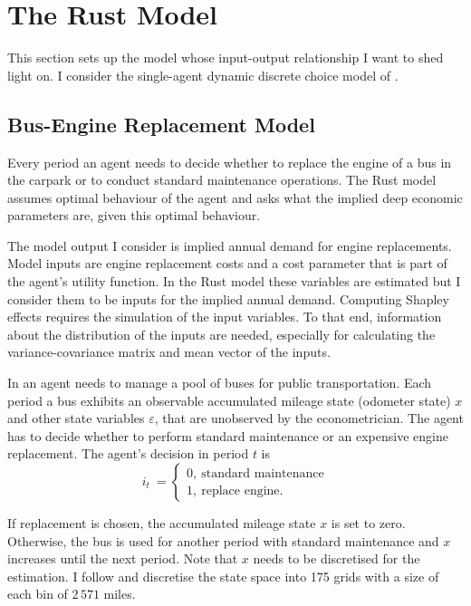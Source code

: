 \section{The Rust Model} \label{rust_model}

This section sets up the model whose input-output relationship I want to shed light on. I consider the single-agent dynamic discrete choice model of \citet{R87}.

\subsection{Bus-Engine Replacement Model}

Every period an agent needs to decide whether to replace the engine of a bus in the carpark or to conduct standard maintenance operations. The Rust model assumes optimal behaviour of the agent and asks what the implied deep economic parameters are, given this optimal behaviour.

The model output I consider is implied annual demand for engine replacements. Model inputs are engine replacement costs and a cost parameter that is part of the agent’s utility function. In the Rust model these variables are estimated but I consider them to be inputs for the implied annual demand. Computing Shapley effects requires the simulation of the input variables. To that end, information about the distribution of the inputs are needed, especially for calculating the variance-covariance matrix and mean vector of the inputs.

In \citet{R87} an agent needs to manage a pool of buses for public transportation. Each period a bus exhibits an observable accumulated mileage state (odometer state) $x$ and other state variables $\varepsilon$, that are unobserved by the econometrician. The agent has to decide whether to perform standard maintenance or an expensive engine replacement. The agent’s decision in period $t$ is
\begin{equation}
i_t\ =
\begin{cases}
0,\ \text{standard maintenance} \\
1,\ \text{replace engine}.
\end{cases}
\end{equation}

\noindent If replacement is chosen, the accumulated mileage state $x$ is set to zero. Otherwise, the bus is used for another period with standard maintenance and $x$ increases until the next period. Note that $x$ needs to be discretised for the estimation. I follow \citet{R87} and discretise the state space into 175 grids with a size of each bin of $2\,571$ miles.

